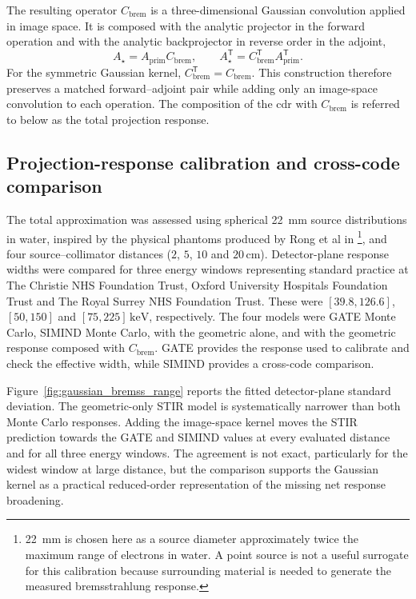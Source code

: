 The resulting operator $C_{\mathrm{brem}}$ is a three-dimensional Gaussian convolution applied in image space. It is composed with the analytic projector in the forward operation and with the analytic backprojector in reverse order in the adjoint,
\begin{equation}
    A_{\star}=A_{\mathrm{prim}}C_{\mathrm{brem}},
    \qquad
    A_{\star}^{\mathsf T}=C_{\mathrm{brem}}^{\mathsf T}
    A_{\mathrm{prim}}^{\mathsf T}.
    \label{eq:brem_matched_operator}
\end{equation}
For the symmetric Gaussian kernel, $C_{\mathrm{brem}}^{\mathsf T}=C_{\mathrm{brem}}$. This construction therefore preserves a matched forward--adjoint pair while adding only an image-space convolution to each operation. The composition of the \gls{cdr} with $C_{\mathrm{brem}}$ is referred to below as the total projection response.

\subsection{Projection-response calibration and cross-code comparison}
\label{subsec:brem_blur_validation}

The total approximation was assessed using spherical \SI{22}{\milli\metre}  source distributions in water, inspired by the physical phantoms produced by Rong et al in \cite{rongDevelopmentEvaluationImproved2012} \footnote{\SI{22}{\milli\metre} is chosen here as a source diameter approximately twice the maximum range of  electrons in water. A point source is not a useful surrogate for this calibration because surrounding material is needed to generate the measured bremsstrahlung response.}, and four source--collimator distances ($2$, $5$, $10$ and $20\,\mathrm{cm}$). Detector-plane response widths were compared for three energy windows representing standard practice at The Christie NHS Foundation Trust, Oxford University Hospitals Foundation Trust and The Royal Surrey NHS Foundation Trust. These were $[39.8,126.6]$, $[50,150]$ and $[75,225]\,\mathrm{keV}$, respectively. The four models were GATE Monte Carlo, SIMIND Monte Carlo,  with the geometric  alone, and  with the geometric response composed with $C_{\mathrm{brem}}$. GATE provides the response used to calibrate and check the effective width, while SIMIND provides a cross-code comparison.

Figure~\ref{fig:gaussian_bremss_range} reports the fitted detector-plane standard deviation. The geometric-only STIR model is systematically narrower than both Monte Carlo responses. Adding the image-space kernel moves the STIR prediction towards the GATE and SIMIND values at every evaluated distance and for all three energy windows. The agreement is not exact, particularly for the widest window at large distance, but the comparison supports the Gaussian kernel as a practical reduced-order representation of the missing net response broadening.

